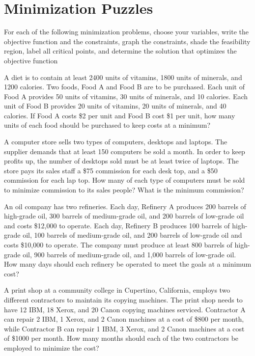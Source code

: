 \section{Minimization Puzzles}

For each of the following minimization problems, choose your variables, write the objective function and the
constraints, graph the constraints, shade the feasibility region, label all critical points, and determine the
solution that optimizes the objective function

\begin{puzzle}
    A diet is to contain at least 2400 units of vitamins, 1800 units of minerals, and 1200 calories. Two
    foods, Food A and Food B are to be purchased. Each unit of Food A provides 50 units of vitamins,
    30 units of minerals, and 10 calories. Each unit of Food B provides 20 units of vitamins, 20 units
    of minerals, and 40 calories. If Food A costs \$2 per unit and Food B cost \$1 per unit, how many
    units of each food should be purchased to keep costs at a minimum?
\end{puzzle}

\begin{puzzle}
    A computer store sells two types of computers, desktops and laptops. The supplier demands that
    at least 150 computers be sold a month. In order to keep profits up, the number of desktops sold
    must be at least twice of laptops. The store pays its sales staff a \$75 commission for each desk
    top, and a \$50 commission for each lap top. How many of each type of computers must be sold to
    minimize commission to its sales people? What is the minimum commission?
\end{puzzle}

\begin{puzzle}
    An oil company has two refineries. Each day, Refinery A produces 200 barrels of high-grade oil,
    300 barrels of medium-grade oil, and 200 barrels of low-grade oil and costs \$12,000 to operate.
    Each day, Refinery B produces 100 barrels of high-grade oil, 100 barrels of medium-grade oil, and
    200 barrels of low-grade oil and costs \$10,000 to operate. The company must produce at least 800
    barrels of high-grade oil, 900 barrels of medium-grade oil, and 1,000 barrels of low-grade oil. How
    many days should each refinery be operated to meet the goals at a minimum cost?

\end{puzzle}

\begin{puzzle}
    A print shop at a community college in Cupertino, California, employs two different contractors
    to maintain its copying machines. The print shop needs to have 12 IBM, 18 Xerox, and 20 Canon
    copying machines serviced. Contractor A can repair 2 IBM, 1 Xerox, and 2 Canon machines at a
    cost of \$800 per month, while Contractor B can repair 1 IBM, 3 Xerox, and 2 Canon machines at
    a cost of \$1000 per month. How many months should each of the two contractors be employed to
    minimize the cost?
\end{puzzle}
